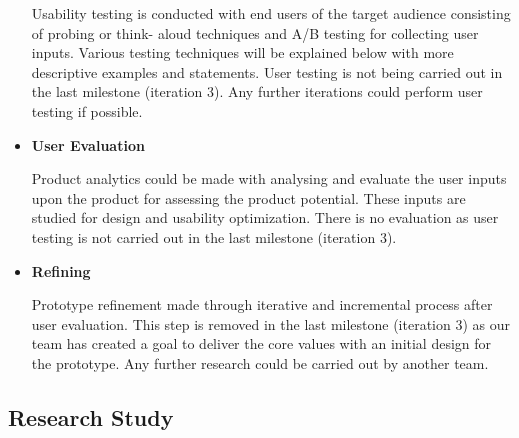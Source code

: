 \begin{itemize}
          \par Usability testing is conducted with end users of the target audience consisting of probing or think-
          aloud techniques and A/B testing for collecting user inputs. Various testing techniques will be
          explained below with more descriptive examples and statements. User testing is not being carried out
          in the last milestone (iteration 3). Any further iterations could perform user testing if possible.
        \item \textbf{User Evaluation}
          \par Product analytics could be made with analysing and evaluate the user inputs upon the product for
          assessing the product potential. These inputs are studied for design and usability optimization. There
          is no evaluation as user testing is not carried out in the last milestone (iteration 3).
        \item \textbf{Refining}
          \par Prototype refinement made through iterative and incremental process after user evaluation. This step
          is removed in the last milestone (iteration 3) as our team has created a goal to deliver the core values
          with an initial design for the prototype. Any further research could be carried out by another team.
      \end{itemize}

  \subsection{Research Study}
